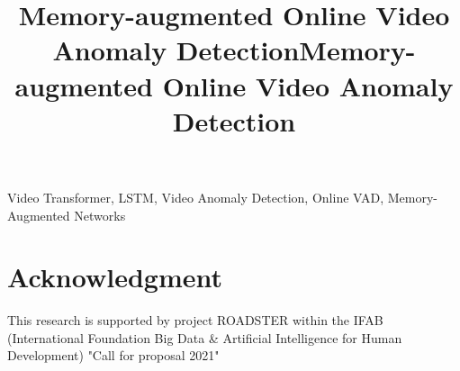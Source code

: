 \documentclass{article}
\title{Memory-augmented Online Video Anomaly Detection}
\begin{document}
%
\maketitle
%
    \title{Memory-augmented Online Video Anomaly Detection}
    \maketitle
    
    \begin{abstract}
        
    \end{abstract}
    \begin{keywords}
        Video Transformer, LSTM, Video Anomaly Detection, Online VAD, Memory-Augmented Networks
    \end{keywords}
    
    
    
    
    

    \section*{Acknowledgment}
    This research is supported by project ROADSTER within the IFAB (International Foundation Big Data \& Artificial Intelligence for Human Development) "Call for proposal 2021"
    
    
    
\end{document}

